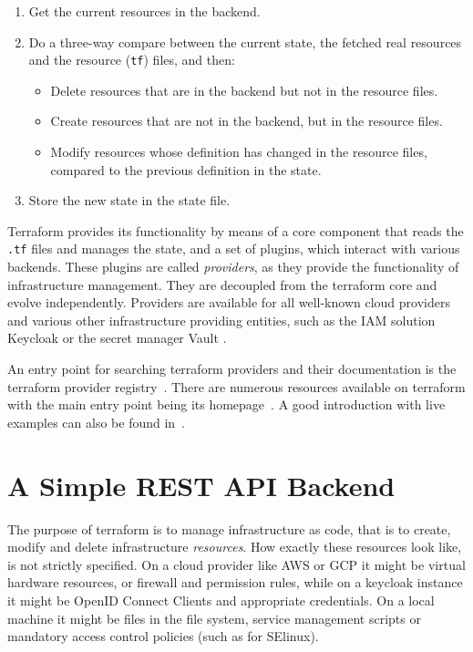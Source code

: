 \documentclass[paper=a4,11pt,numbers=noenddot]{article}
\begin{document}
\begin{enumerate}
\item\label{itm:tf-read} Get the current resources in the backend.
\item\label{itm:tf-compare} Do a three-way compare between the current state, the fetched real resources and the resource (\verb'tf') files, and then:
  \begin{itemize}
  \item Delete resources that are in the backend but not in the resource files.
  \item Create resources that are not in the backend, but in the resource files.
  \item Modify resources whose definition has changed in the resource files, compared to the previous definition in the state.
  \end{itemize}
\item\label{itm:tf-create-update} Store the new state in the state file.
\end{enumerate}

Terraform provides its functionality by means of a core component that reads the \verb'.tf' files and manages the state, and a set of plugins, which interact with various backends. These plugins are called \emph{providers}, as they provide the functionality of infrastructure management. They are decoupled from the terraform core and evolve independently. Providers are available for all well-known cloud providers and various other infrastructure providing entities, such as the IAM solution Keycloak \autocite{team_keycloak_nodate} or the secret manager Vault \autocite{noauthor_vault_nodate}.

An entry point for searching terraform providers and their documentation is the terraform provider registry~\autocite{noauthor_terraform_registry_nodate}. There are numerous resources available on terraform with the main entry point being its homepage~\autocite{noauthor_terraform_nodate}. A good introduction with live examples can also be found in~\autocite{brikman_terraform_2022}.


\section{A Simple REST API Backend}
\label{sec:simple-rest-api}

The purpose of terraform is to manage infrastructure as code, that is to create, modify and delete infrastructure \emph{resources}. How exactly these resources look like, is not strictly specified. On a cloud provider like AWS or GCP it might be virtual hardware resources, or firewall and permission rules, while on a keycloak instance it might be OpenID Connect Clients and appropriate credentials. On a local machine it might be files in the file system, service management scripts or mandatory access control policies (such as for SElinux).
\end{document}

